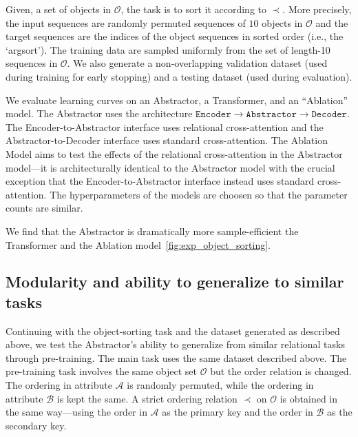 Given, a set of objects in $\mathcal{O}$, the task is to sort it according to $\prec$. More precisely, the input sequences are randomly permuted sequences of $10$ objects in $\mathcal{O}$ and the target sequences are the indices of the object sequences in sorted order (i.e., the `argsort'). The training data are sampled uniformly from the set of length-10 sequences in $\mathcal{O}$. We also generate a non-overlapping validation dataset (used during training for early stopping) and a testing dataset (used during evaluation).

We evaluate learning curves on an Abstractor, a Transformer, and an ``Ablation'' model. The Abstractor uses the architecture $\texttt{Encoder} \to \texttt{Abstractor} \to \texttt{Decoder}$. The Encoder-to-Abstractor interface uses relational cross-attention and the Abstractor-to-Decoder interface uses standard cross-attention. The Ablation Model aims to test the effects of the relational cross-attention in the Abstractor model---it is architecturally identical to the Abstractor model with the crucial exception that the Encoder-to-Abstractor interface instead uses standard cross-attention. The hyperparameters of the models are choosen so that the parameter counts are similar. %

We find that the Abstractor is dramatically more sample-efficient the Transformer and the Ablation model~\cref{fig:exp_object_sorting}.

\subsection{Modularity and ability to generalize to similar tasks}

Continuing with the object-sorting task and the dataset generated as described above, we test the Abstractor's ability to generalize from similar relational tasks through pre-training. The main task uses the same dataset described above. The pre-training task involves the same object set $\mathcal{O}$ but the order relation is changed. The ordering in attribute $\mathcal{A}$ is randomly permuted, while the ordering in attribute $\mathcal{B}$ is kept the same. A strict ordering relation $\prec$ on $\mathcal{O}$ is obtained in the same way---using the order in $\mathcal{A}$ as the primary key and the order in $\mathcal{B}$ as the secondary key.

